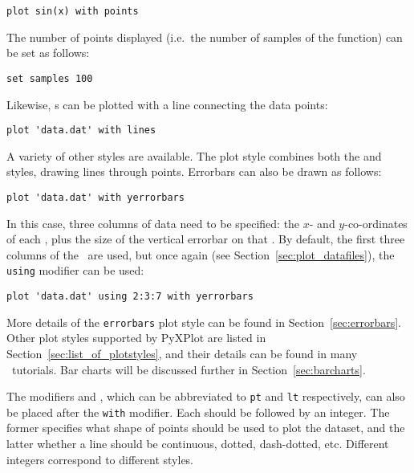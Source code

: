 \begin{verbatim}
plot sin(x) with points
\end{verbatim}

\noindent The number of points displayed (i.e.\ the number of samples of the
function) can be set as follows:

\begin{verbatim}
set samples 100
\end{verbatim}

\noindent Likewise, \datafile s can be plotted with a line connecting the data
points:

\begin{verbatim}
plot 'data.dat' with lines
\end{verbatim}

A variety of other styles are available. The  plot style
combines both the  and  styles, drawing lines
through points. Errorbars can also be drawn as follows:

\begin{verbatim}
plot 'data.dat' with yerrorbars
\end{verbatim}

\noindent In this case, three columns of data need to be specified: the $x$-
and $y$-co-ordinates of each \datapoint, plus the size of the vertical errorbar
on that \datapoint. By default, the first three columns of the \datafile\ are
used, but once again (see Section~\ref{sec:plot_datafiles}), the {\tt using}
modifier can be used:

\begin{verbatim}
plot 'data.dat' using 2:3:7 with yerrorbars
\end{verbatim}

More details of the {\tt errorbars} plot style can be found in
Section~\ref{sec:errorbars}. Other plot styles supported by PyXPlot are listed in
Section~\ref{sec:list_of_plotstyles}, and their details can be found in many
\gnuplot\ tutorials. Bar charts will be discussed further in
Section~\ref{sec:barcharts}.

\label{sec:pointtype}
The modifiers  and , which can be
abbreviated to {\tt pt} and {\tt lt} respectively, can also be placed after the
{\tt with} modifier. Each should be followed by an integer.  The former
specifies what shape of points should be used to plot the dataset, and the
latter whether a line should be continuous, dotted, dash-dotted, etc.
Different integers correspond to different styles.


